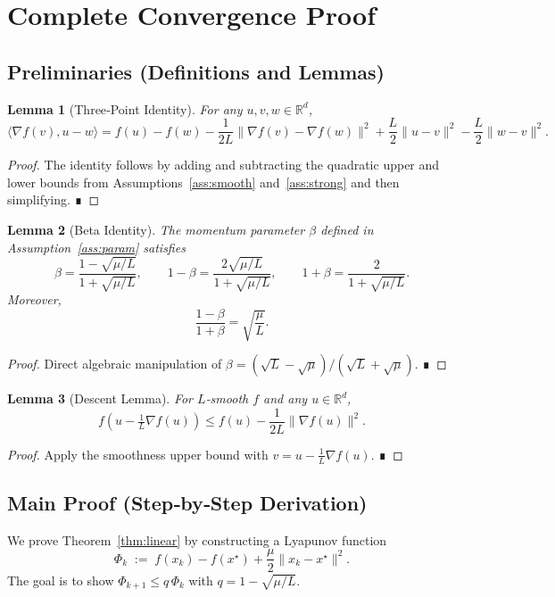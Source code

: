\documentclass[11pt]{article}
\newtheorem{lemma}{Lemma}[section]
\begin{document}
\section*{Complete Convergence Proof}

\subsection*{Preliminaries (Definitions and Lemmas)}
\begin{lemma}[Three‑Point Identity]\label{lem:three-point}
For any $u,v,w\in\mathbb{R}^d$,
\[
    \langle \nabla f(v),u-w\rangle
    = f(u)-f(w)-\frac{1}{2L}\|\nabla f(v)-\nabla f(w)\|^2
      +\frac{L}{2}\|u-v\|^2-\frac{L}{2}\|w-v\|^2 .
\]
\end{lemma}
\begin{proof}
The identity follows by adding and subtracting the quadratic upper and lower bounds from Assumptions~\ref{ass:smooth} and~\ref{ass:strong} and then simplifying. ∎
\end{proof}

\begin{lemma}[Beta Identity]\label{lem:beta-identity}
The momentum parameter $\beta$ defined in Assumption~\ref{ass:param} satisfies
\[
    \beta = \frac{1-\sqrt{\mu/L}}{1+\sqrt{\mu/L}},\qquad
    1-\beta = \frac{2\sqrt{\mu/L}}{1+\sqrt{\mu/L}},\qquad
    1+\beta = \frac{2}{1+\sqrt{\mu/L}} .
\]
Moreover,
\[
    \frac{1-\beta}{1+\beta}= \sqrt{\frac{\mu}{L}} .
\]
\end{lemma}
\begin{proof}
Direct algebraic manipulation of $\beta = (\sqrt{L}-\sqrt{\mu})/(\sqrt{L}+\sqrt{\mu})$. ∎
\end{proof}

\begin{lemma}[Descent Lemma]\label{lem:descent}
For $L$‑smooth $f$ and any $u\in\mathbb{R}^d$,
\[
    f(u-\tfrac{1}{L}\nabla f(u))\le f(u)-\frac{1}{2L}\|\nabla f(u)\|^2 .
\]
\end{lemma}
\begin{proof}
Apply the smoothness upper bound with $v = u-\frac{1}{L}\nabla f(u)$. ∎
\end{proof}

\subsection*{Main Proof (Step‑by‑Step Derivation)}
We prove Theorem~\ref{thm:linear} by constructing a Lyapunov function
\[
    \Phi_k \;:=\; f(x_k)-f(x^\star)+\frac{\mu}{2}\|x_k-x^\star\|^2 .
\]
The goal is to show $\Phi_{k+1}\le q\,\Phi_k$ with $q=1-\sqrt{\mu/L}$.
\end{document}
